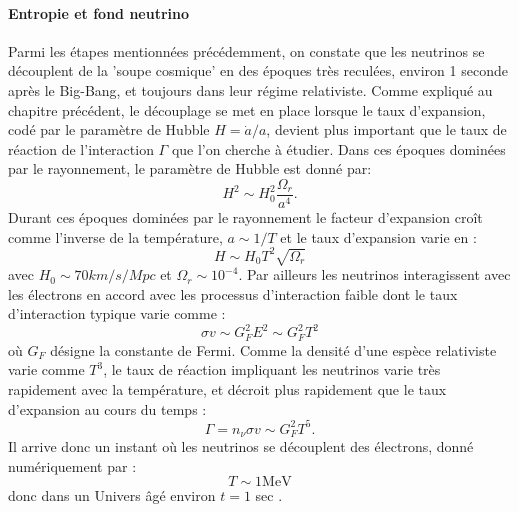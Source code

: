 \paragraph{Entropie et fond neutrino} 
Parmi les étapes mentionnées précédemment, on constate que les neutrinos se découplent de la 'soupe cosmique' en des époques très reculées, environ 1 seconde après le Big-Bang, et toujours dans leur régime relativiste. Comme expliqué au chapitre précédent, le découplage se met en place lorsque le taux d'expansion, codé par le paramètre de Hubble $H=\dot a /a$, devient plus important que le taux de réaction de l'interaction $\Gamma$ que l'on cherche à étudier. Dans ces époques dominées par le rayonnement, le paramètre de Hubble est donné par:
\begin{equation}
H^2\sim H_0^2 \frac{\Omega_r}{a^4}.
\end{equation}
Durant ces époques dominées par le rayonnement le facteur d'expansion croît comme l'inverse de la température, $a\sim 1/T$ et le taux d'expansion varie en :
\begin{equation}
H\sim H_0 T^2 \sqrt{\Omega_r}
\end{equation}
avec $H_0\sim 70 km/s/Mpc$ et $\Omega_r \sim 10^{-4}$. Par ailleurs les neutrinos interagissent avec les électrons en accord avec les processus d'interaction faible dont le taux d'interaction  typique varie comme :
\begin{equation}
\sigma v \sim G_F^2 E^2 \sim G_F^2 T^2
\end{equation}
où $G_F$ désigne la constante de Fermi. Comme la densité d'une espèce relativiste varie comme $T^3$, le taux de réaction impliquant les neutrinos varie très rapidement avec la température, et décroit plus rapidement que le taux d'expansion au cours du temps :
\begin{equation}
\Gamma =n_\nu \sigma v \sim G_F^2 T^5.
\end{equation}
Il arrive donc un instant où les neutrinos se découplent des électrons, donné numériquement par :
\begin{equation}
T\sim 1 \mathrm{MeV}
\end{equation}
donc dans un Univers âgé environ $t=1$ sec .

